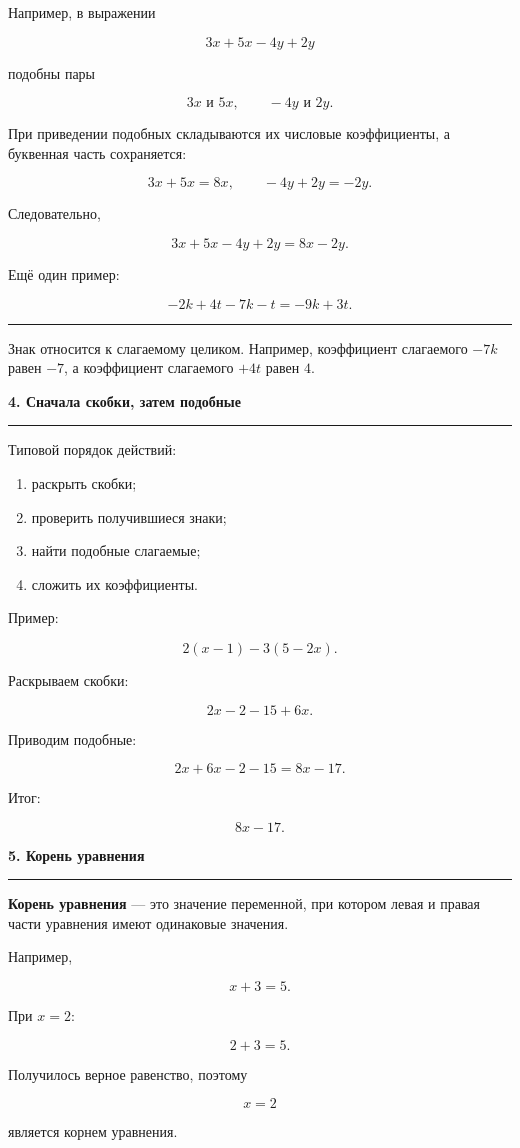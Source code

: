 \documentclass[a4paper,12pt]{article}
\newcommand{\sectiontitle}[1]{%
    \vspace{0.35em}%
    {\Large\bfseries\color{darkaccent}#1\par}%
    \vspace{0.2em}%
    {\color{accent}\rule{\linewidth}{0.7pt}}%
    \vspace{0.6em}%
}
\newcommand{\important}[1]{%
    \par\vspace{0.3em}%
    \noindent
    \begin{minipage}{\linewidth}
        {\color{accent}\rule{2.2pt}{\baselineskip}}\hspace{0.6em}%
        \begin{minipage}[t]{0.94\linewidth}
            #1
        \end{minipage}
    \end{minipage}%
    \par\vspace{0.3em}%
}
\begin{document}
Например, в выражении

\[
3x+5x-4y+2y
\]

подобны пары

\[
3x \text{ и } 5x,
\qquad
-4y \text{ и } 2y.
\]

При приведении подобных складываются их числовые коэффициенты,
а буквенная часть сохраняется:

\[
3x+5x=8x,
\qquad
-4y+2y=-2y.
\]

Следовательно,

\[
3x+5x-4y+2y=8x-2y.
\]

Ещё один пример:

\[
-2k+4t-7k-t=-9k+3t.
\]

\important{
Знак относится к слагаемому целиком. Например, коэффициент слагаемого
\(-7k\) равен \(-7\), а коэффициент слагаемого \(+4t\) равен \(4\).
}

\sectiontitle{4. Сначала скобки, затем подобные}

Типовой порядок действий:

\begin{enumerate}
    \item раскрыть скобки;
    \item проверить получившиеся знаки;
    \item найти подобные слагаемые;
    \item сложить их коэффициенты.
\end{enumerate}

Пример:

\[
2(x-1)-3(5-2x).
\]

Раскрываем скобки:

\[
2x-2-15+6x.
\]

Приводим подобные:

\[
2x+6x-2-15=8x-17.
\]

Итог:

\[
\boxed{8x-17}.
\]

\sectiontitle{5. Корень уравнения}

\textbf{Корень уравнения} --- это значение переменной, при котором
левая и правая части уравнения имеют одинаковые значения.

Например,

\[
x+3=5.
\]

При \(x=2\):

\[
2+3=5.
\]

Получилось верное равенство, поэтому

\[
\boxed{x=2}
\]

является корнем уравнения.
\end{document}
